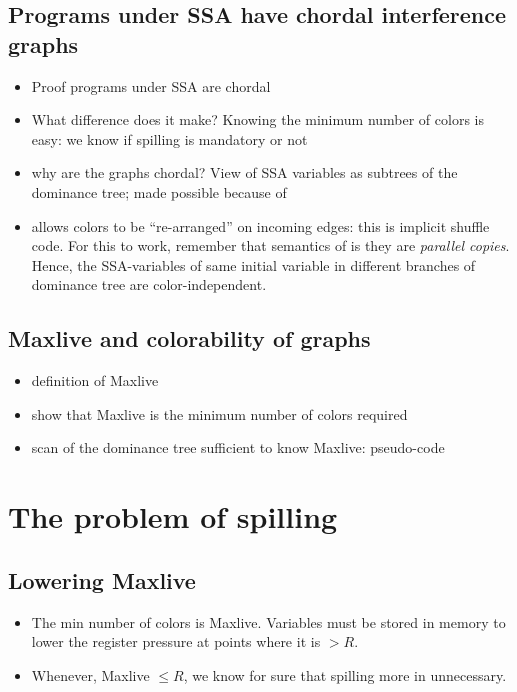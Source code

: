 \subsection{Programs under SSA have chordal interference graphs}
\begin{itemize}
  \item Proof programs under SSA are chordal
  \item What difference does it make? Knowing the minimum number of colors is 
    easy: we know if spilling is mandatory or not
  \item why are the graphs chordal? View of SSA variables as subtrees of the 
    dominance tree; made possible because of \phifuns
  \item \phifuns allows colors to be ``re-arranged'' on incoming edges: this 
    is implicit shuffle code. For this to work, remember that semantics of 
    \phifun is they are \emph{parallel copies}. Hence, the SSA-variables of 
    same initial variable in different branches of dominance tree are 
    color-independent.
\end{itemize}

\subsection{Maxlive and colorability of graphs}
\begin{itemize}
  \item definition of Maxlive
  \item show that Maxlive is the minimum number of colors required
  \item scan of the dominance tree sufficient to know Maxlive: pseudo-code
\end{itemize}
    


\section{The problem of spilling}

\subsection{Lowering Maxlive}
\begin{itemize}
  \item The min number of colors is Maxlive. Variables must be stored in memory 
    to lower the register pressure at points where it is $>R$.
  \item Whenever, Maxlive $\leq R$, we know for sure that spilling more in 
    unnecessary.
\end{itemize}


